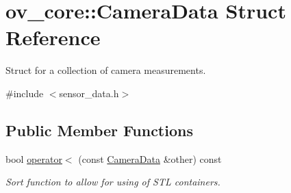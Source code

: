 \hypertarget{structov__core_1_1CameraData}{}\section{ov\+\_\+core\+:\+:Camera\+Data Struct Reference}
\label{structov__core_1_1CameraData}


Struct for a collection of camera measurements.  




{\ttfamily \#include $<$sensor\+\_\+data.\+h$>$}

\subsection*{Public Member Functions}
\begin{DoxyCompactItemize}
\item 
\mbox{\label{structov__core_1_1CameraData_a5f21a5ac4392c764574e289776adbf97}} 
bool \hyperlink{structov__core_1_1CameraData_a5f21a5ac4392c764574e289776adbf97}{operator$<$} (const \hyperlink{structov__core_1_1CameraData}{Camera\+Data} \&other) const
\begin{DoxyCompactList}\small\item\em Sort function to allow for using of S\+TL containers. \end{DoxyCompactList}\end{DoxyCompactItemize}
